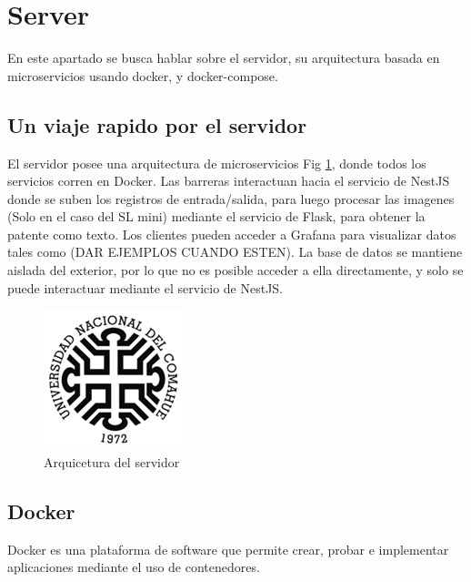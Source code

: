 
\section{Server}

En este apartado se busca hablar sobre el servidor, su arquitectura basada en microservicios usando docker, y docker-compose.

\subsection{Un viaje rapido por el servidor}

El servidor posee una arquitectura de microservicios Fig \ref{fig:server}, donde todos los servicios corren en Docker. Las barreras interactuan hacia el servicio de NestJS donde se suben los registros de entrada/salida, para luego procesar las imagenes (Solo en el caso del SL mini) mediante el servicio de Flask, para obtener la patente como texto. Los clientes pueden acceder a Grafana para visualizar datos tales como (DAR EJEMPLOS CUANDO ESTEN). La base de datos se mantiene aislada del exterior, por lo que no es posible acceder a ella directamente, y solo se puede interactuar mediante el servicio de NestJS.

\begin{figure}[bth]
    \centering
    \includegraphics[width=.5\textwidth]{imgs/uncoma.png}
    \caption{Arquicetura del servidor}
    \label{fig:server}
\end{figure}

\subsection{Docker}

Docker es una plataforma de software que permite crear, probar e implementar aplicaciones mediante el uso de contenedores.

